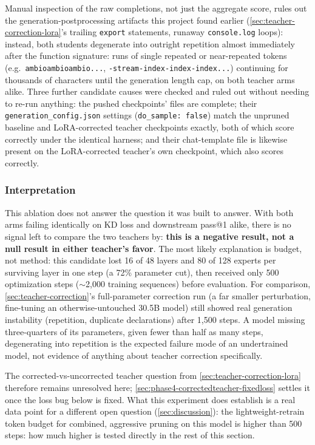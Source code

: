 \documentclass{article}
\theoremstyle{plain}
\theoremstyle{definition}
\theoremstyle{remark}
\begin{document}
Manual inspection of the raw completions, not just the aggregate score,
rules out the generation-postprocessing artifacts this project found
earlier (\cref{sec:teacher-correction-lora}'s trailing \texttt{export}
statements, runaway \texttt{console.log} loops): instead, both students
degenerate into outright repetition almost immediately after the function
signature: runs of single repeated or near-repeated tokens (e.g.\
\texttt{ambioambioambio...}, \texttt{-stream-index-index-index...})
continuing for thousands of characters until the generation length cap,
on both teacher arms alike. Three further candidate causes were checked
and ruled out without needing to re-run anything: the pushed checkpoints'
files are complete; their \texttt{generation\_config.json} settings
(\texttt{do\_sample: false}) match the unpruned baseline and
LoRA-corrected teacher checkpoints exactly, both of which score correctly
under the identical harness; and their chat-template file is likewise
present on the LoRA-corrected teacher's own checkpoint, which also scores
correctly.

\subsubsection{Interpretation}

This ablation does not answer the question it was built to answer. With
both arms failing identically on KD loss and downstream pass@1 alike,
there is no signal left to compare the two teachers by:
\textbf{this is a negative result, not a null result in either teacher's
favor}. The most likely explanation is budget, not method: this candidate
lost 16 of 48 layers and 80 of 128 experts per surviving layer in one
step (a 72\% parameter cut), then received only 500 optimization steps
($\sim$2,000 training sequences) before evaluation. For comparison,
\cref{sec:teacher-correction}'s full-parameter correction run (a far
smaller perturbation, fine-tuning an otherwise-untouched 30.5B model)
still showed real generation instability (repetition, duplicate
declarations) after 1,500 steps. A model missing three-quarters of its
parameters, given fewer than half as many steps, degenerating into
repetition is the expected failure mode of an undertrained model, not
evidence of anything about teacher correction specifically.

The corrected-vs-uncorrected teacher question from
\cref{sec:teacher-correction-lora} therefore remains unresolved here;
\cref{sec:phase4-correctedteacher-fixedloss} settles it once the loss
bug below is fixed. What this
experiment does establish is a real data point for a different open
question (\cref{sec:discussion}): the lightweight-retrain token budget
for combined, aggressive pruning on this model is higher than 500 steps:
how much higher is tested directly in the rest of this section.
\end{document}
